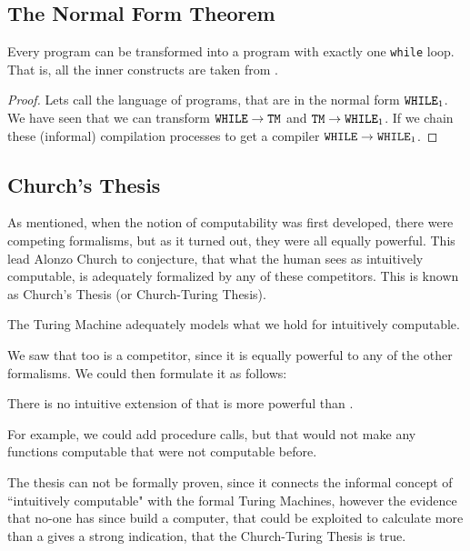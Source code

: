\subsection{The Normal Form Theorem}
\begin{theorem}
	Every \WHILE program can be transformed into a \WHILE program with exactly 
	one {\tt while} loop. That is, all the inner constructs are taken from \FOR.
\end{theorem}
\begin{proof}
	Lets call the language of \WHILE programs, that are in the normal form $\mathtt{WHILE}_1$.
	We have seen that we can transform $\mathtt{WHILE} \rightarrow \mathtt{TM}$ and 
	$\mathtt{TM} \rightarrow \mathtt{WHILE}_1$. If we chain these (informal) compilation processes to 
	get a compiler $\mathtt{WHILE} \rightarrow \mathtt{WHILE}_1$.
\end{proof}

\subsection{Church's Thesis}
As mentioned, when the notion of computability was first developed, there 
were competing formalisms, but as it turned out, they were all equally 
powerful. This lead Alonzo Church to conjecture, that what the human sees 
as intuitively computable, is adequately formalized by any of these 
competitors. This is known as Church's Thesis (or Church-Turing Thesis).

\begin{thesis}
	The Turing Machine adequately models what we hold for intuitively computable.
\end{thesis}

We saw that \WHILE too is a competitor, since it is equally powerful to any 
of the other formalisms. We could then formulate it as follows:

\begin{thesis}
	There is no intuitive extension of \WHILE that is more powerful than \WHILE.
\end{thesis}

For example, we could add procedure calls, but that would not make any 
functions computable that were not computable before.

The thesis can not be formally proven, since it connects the informal concept 
of ``intuitively computable" with the formal Turing Machines, however the 
evidence that no-one has since build a computer, that could be exploited to
calculate more than a \TM gives a strong indication, that the Church-Turing
Thesis is true.

